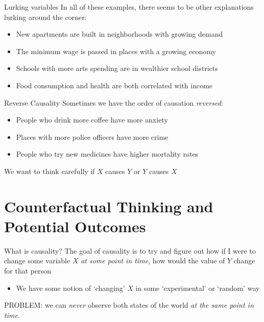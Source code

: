 \documentclass[aspectratio=169,t,11pt,table]{beamer}
\begin{document}
\begin{frame}{Lurking variables}
  In all of these examples, there seems to be other explanations \alert{lurking around the corner}:
  \begin{itemize}
    \item New apartments are built in neighborhoods with growing demand
    
    \item The minimum wage is passed in places with a growing economy
    
    \item Schools with more arts spending are in wealthier school districts
    
    \item Food consumption and health are both correlated with income
    
  \end{itemize}
\end{frame}

\begin{frame}{Reverse Causality}
  Sometimes we have the order of causation \emph{reversed}:
  \begin{itemize}
    \item People who drink more coffee have more anxiety
    
    \item Places with more police officers have more crime 
    
    \item People who try new medicines have higher mortality rates
  \end{itemize}

  \bigskip
  We want to think carefully if $X$ causes $Y$ or $Y$ causes $X$
\end{frame}

\section{Counterfactual Thinking and Potential Outcomes}

\begin{frame}{What is causality?}
  The goal of \alert{causality} is to try and figure out how if I were to change some variable $X$ \emph{at some point in time}, how would the value of $Y$ change for that person
  \begin{itemize}
    \item We have some notion of `changing' $X$ in some `experimental' or `random' way
  \end{itemize}

  \pause
  \bigskip
  \alert{PROBLEM:} we can \emph{never} observe both states of the world \emph{at the same point in time}.
\end{frame}
\end{document}
